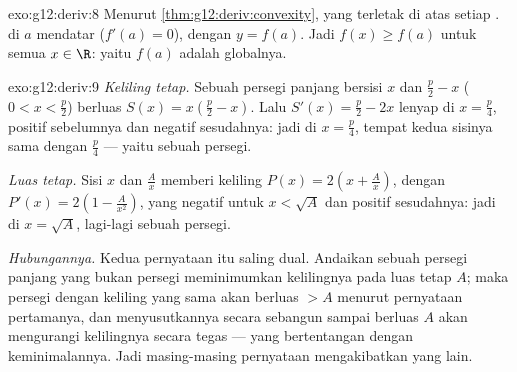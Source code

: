 \begin{solution}{exo:g12:deriv:8}
Menurut \cref{thm:g12:deriv:convexity},    yang  terletak di atas setiap .  di $a$
mendatar ($f'(a) = 0$), dengan  $y = f(a)$. Jadi $f(x) \geq f(a)$
untuk semua $x \in \R$: yaitu $f(a)$ adalah  globalnya.
\end{solution}

\begin{solution}{exo:g12:deriv:9}
\emph{Keliling tetap.} Sebuah persegi panjang bersisi $x$ dan $\frac{p}{2} - x$
($0 < x < \frac p2$) berluas $S(x) = x\left(\frac p2 - x\right)$. Lalu
$S'(x) = \frac p2 - 2x$ lenyap di $x = \frac p4$, positif sebelumnya dan
negatif sesudahnya: jadi  di $x = \frac{p}{4}$, tempat kedua sisinya
sama dengan $\frac p4$ --- yaitu sebuah persegi.

\emph{Luas tetap.} Sisi $x$ dan $\frac Ax$ memberi keliling
$P(x) = 2\left(x + \frac Ax\right)$, dengan
$P'(x) = 2\left(1 - \frac{A}{x^2}\right)$, yang negatif untuk $x < \sqrt A$ dan
positif sesudahnya: jadi  di $x = \sqrt{A}$, lagi-lagi sebuah persegi.

\emph{Hubungannya.} Kedua pernyataan itu saling dual. Andaikan sebuah persegi
panjang yang bukan persegi meminimumkan kelilingnya pada luas tetap $A$; maka
persegi dengan keliling yang sama akan berluas $> A$ menurut pernyataan
pertamanya, dan menyusutkannya secara sebangun sampai berluas $A$ akan
mengurangi kelilingnya secara tegas --- yang bertentangan dengan
keminimalannya. Jadi masing-masing pernyataan mengakibatkan yang lain.
\end{solution}

